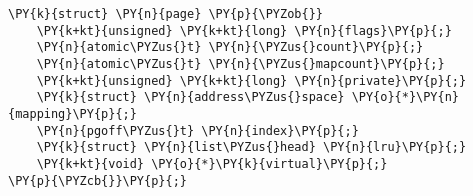\begin{Verbatim}[commandchars=\\\{\}]
\PY{k}{struct} \PY{n}{page} \PY{p}{\PYZob{}}
   	\PY{k+kt}{unsigned} \PY{k+kt}{long} \PY{n}{flags}\PY{p}{;}
	\PY{n}{atomic\PYZus{}t} \PY{n}{\PYZus{}count}\PY{p}{;}
   	\PY{n}{atomic\PYZus{}t} \PY{n}{\PYZus{}mapcount}\PY{p}{;}
	\PY{k+kt}{unsigned} \PY{k+kt}{long} \PY{n}{private}\PY{p}{;}
	\PY{k}{struct} \PY{n}{address\PYZus{}space} \PY{o}{*}\PY{n}{mapping}\PY{p}{;}
	\PY{n}{pgoff\PYZus{}t} \PY{n}{index}\PY{p}{;}
	\PY{k}{struct} \PY{n}{list\PYZus{}head} \PY{n}{lru}\PY{p}{;}
	\PY{k+kt}{void} \PY{o}{*}\PY{k}{virtual}\PY{p}{;}
\PY{p}{\PYZcb{}}\PY{p}{;}
\end{Verbatim}
